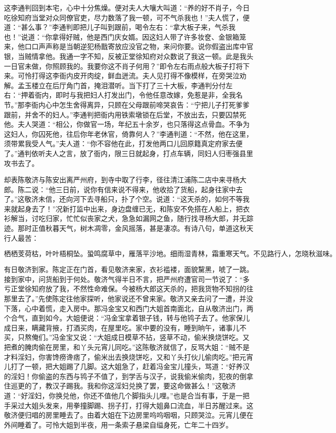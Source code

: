 这李通判回到本宅，心中十分焦燥。便对夫人大嚷大叫道：“养的好不肖子，今日吃徐知府当堂对众同僚官吏，尽力数落了我一顿，可不气杀我也！”夫人慌了，便道：“甚么事？”李通判即把儿子叫到跟前，喝令左右：“拿大板子来，气杀我也！”说道：“你拿得好贼，他是西门庆女婿。因这妇人带了许多妆奁、金银箱笼来，他口口声声称是当朝逆犯杨戬寄放应没官之物，来问你要。说你假盗出库中官银，当贼情拿他。我通一字不知，反被正堂徐知府对众数说了我这一顿。此是我头一日官未做，你照顾我的。我要你这不肖子何用？”即令左右雨点般大板子打将下来。可怜打得这李衙内皮开肉绽，鲜血迸流。夫人见打得不像模样，在旁哭泣劝解。孟玉楼立在后厅角门首，掩泪潜听。当下打了三十大板，李通判分付左右：“押着衙内，即时与我把妇人打发出门，令他任意改嫁，免惹是非，全我名节。”那李衙内心中怎生舍得离异，只顾在父母跟前啼哭哀告：“宁把儿子打死爹爹跟前，并舍不的妇人。”李通判把衙内用铁索墩锁在后堂，不放出去，只要囚禁死他。夫人哭道：“相公，你做官一场，年纪五十余岁，也只落得这点骨血。不争为这妇人，你囚死他，往后你年老休官，倚靠何人？”李通判道：“不然，他在这里，须带累我受人气。”夫人道：“你不容他在此，打发他两口儿回原籍真定府家去便了。”通判依听夫人之言，放了衙内，限三日就起身，打点车辆，同妇人归枣强县里攻书去了。

却表陈敬济与陈安出离严州府，到寺中取了行李，径往清江浦陈二店中来寻杨大郎。陈二说：“他三日前，说你有信来说不得来，他收拾了货船，起身往家中去了。”这敬济未信，还向河下去寻船只，扑了个空。说道：“这天杀的，如何不等我来就起身去了！”况新打监中出来，身边盘缠已无，和陈安不免搭在人船上，把衣衫解当，讨吃归家，忙忙似丧家之犬，急急如漏网之鱼，随行找寻杨大郎，并无踪迹。那时正值秋暮天气，树木凋零，金风摇落，甚是凄凉。有诗八句，单道这秋天行人最苦：

\[
栖栖芰荷枯，叶叶梧桐坠。蛩鸣腐草中，雁落平沙地。
细雨湿青林，霜重寒天气。不见路行人，怎晓秋滋味。
\]

有日敬济到家。陈定正在门首，看见敬济来家，衣衫褴褛，面貌黧黑，唬了一跳。接到家中，问货船到于何处。敬济气得半日不言，把严州府遭官司一节说了：“多亏正堂徐知府放了我，不然性命难保。今被杨大郎这天杀的，把我货物不知拐的往那里去了。”先使陈定往他家探听，他家说还不曾来家。敬济又亲去问了一遭，并没下落，心中着慌，走入房中。那冯金宝又和西门大姐首南面北，自从敬济出门，两个合气，直到如今。大姐便说：“冯金宝拿着银子钱，转与他鸨子去了。他家保儿成日来，瞒藏背掖，打酒买肉，在屋里吃。家中要的没有，睡到晌午，诸事儿不买，只熬俺们。”冯金宝又说：“大姐成日模草不拈，竖草不动，偷米换烧饼吃。又把煮的腌肉偷在房里，和丫头元宵儿同吃。”这陈敬济就信了，反骂大姐：“贼不是才料淫妇，你害馋痨谗痞了，偷米出去换烧饼吃，又和丫头打伙儿偷肉吃。”把元宵儿打了一顿，把大姐踢了几脚。这大姐急了，赶着冯金宝儿撞头，骂道：“好养汉的淫妇！你偷盗的东西与鸨子不值了，到学舌与汉子，说我偷米偷肉，犯夜的倒拿住巡更的了，教汉子踢我。我和你这淫妇兑换了罢，要这命做甚么！”这敬济道：“好淫妇，你换兑他，你还不值他几个脚指头儿哩。”也是合当有事，于是一把手采过大姐头发来，用拳撞脚踢、拐子打，打得大姐鼻口流血，半日苏醒过来。这敬济便归唱的房里睡去了。由着大姐在下边房里呜呜咽咽，只顾哭泣。元宵儿便在外间睡着了。可怜大姐到半夜，用一条索子悬梁自缢身死，亡年二十四岁。

